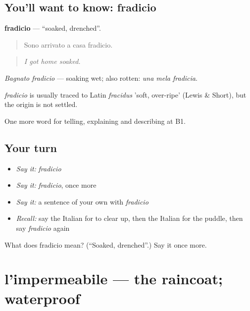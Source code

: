 \subsection*{You'll want to know: fradicio}
\textbf{fradicio} — \textquotedblleft{}soaked, drenched\textquotedblright{}.

\begin{quote}
Sono arrivato a casa fradicio.
\end{quote}

\begin{quote}
\emph{I got home soaked.}
\end{quote}

\emph{Bagnato fradicio} — soaking wet; also rotten: \emph{una mela fradicia}.

\begin{cousinweb}
\emph{fradicio} is usually traced to Latin \emph{fracidus} 'soft, over-ripe' (Lewis \& Short), but the origin is not settled.
\end{cousinweb}

\begin{grammarlens}[title={What you've built}]
One more word for telling, explaining and describing at B1.
\end{grammarlens}

\subsection*{Your turn}
\begin{itemize}
\raggedright
  \item \emph{Say it:} \emph{fradicio}
  \item \emph{Say it:} \emph{fradicio}, once more
  \item \emph{Say it:} a sentence of your own with \emph{fradicio}
  \item \emph{Recall:} say the Italian for to clear up, then the Italian for the puddle, then say \emph{fradicio} again
\end{itemize}

\begin{tcolorbox}[breakable,colback=teal!4,colframe=teal!35!black,title={Before you move on}]
What does fradicio mean? (\textquotedblleft{}Soaked, drenched\textquotedblright{}.) Say it once more.
\end{tcolorbox}
\section[l'impermeabile]{l'impermeabile — the raincoat; waterproof}

